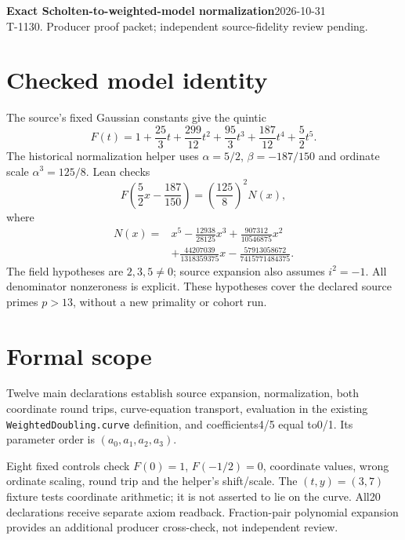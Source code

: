 \documentclass[10pt]{article}
\begin{document}
\textbf{Exact Scholten-to-weighted-model normalization}\hfill2026-10-31\\T-1130. Producer proof packet; independent source-fidelity review pending.
\section*{Checked model identity}
The source's fixed Gaussian constants give the quintic
\[F(t)=1+\frac{25}{3}t+\frac{299}{12}t^2+\frac{95}{3}t^3+\frac{187}{12}t^4+\frac52t^5.\]
The historical normalization helper uses $\alpha=5/2$, $\beta=-187/150$ and ordinate scale $\alpha^3=125/8$. Lean checks
\[F\left(\frac52x-\frac{187}{150}\right)=\left(\frac{125}{8}\right)^2N(x),\]
where
\begin{align*}
N(x)={}&x^5-\frac{12938}{28125}x^3+\frac{907312}{10546875}x^2\\
&+\frac{44207039}{1318359375}x-\frac{57913058672}{7415771484375}.
\end{align*}
The field hypotheses are $2,3,5\ne0$; source expansion also assumes $i^2=-1$. All denominator nonzeroness is explicit. These hypotheses cover the declared source primes $p>13$, without a new primality or cohort run.
\begin{center}\end{center}
\section*{Formal scope}
Twelve main declarations establish source expansion, normalization, both coordinate round trips, curve-equation transport, evaluation in the existing \texttt{WeightedDoubling.curve} definition, and coefficients4/5 equal to0/1. Its parameter order is $(a_0,a_1,a_2,a_3)$.

Eight fixed controls check $F(0)=1$, $F(-1/2)=0$, coordinate values, wrong ordinate scaling, round trip and the helper's shift/scale. The $(t,y)=(3,7)$ fixture tests coordinate arithmetic; it is not asserted to lie on the curve. All20 declarations receive separate axiom readback. Fraction-pair polynomial expansion provides an additional producer cross-check, not independent review.
\end{document}
